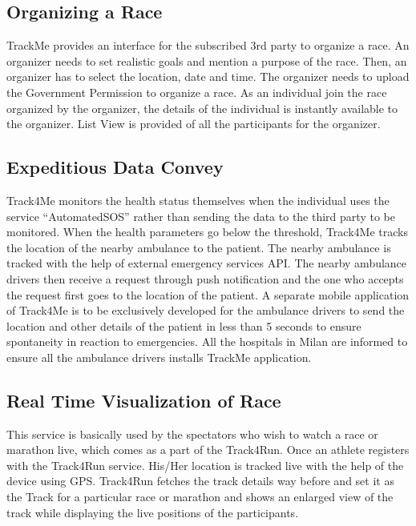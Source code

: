 \subsection{Organizing a Race}
\qquad TrackMe provides an interface for the subscribed 3rd party to organize a race.  An organizer needs to set realistic goals and mention a purpose of the race.  Then, an organizer has to select the location, date and time. The organizer needs to upload the Government Permission to organize a race. As an individual join the race organized by the organizer, the details of the individual is instantly available to the organizer. List View is provided of all the participants for the organizer.

\subsection{Expeditious Data Convey}
\qquad Track4Me monitors the health status themselves when the individual uses the service “AutomatedSOS” rather than sending the data to the third party to be monitored. When the health parameters go below the threshold, Track4Me tracks the location of the nearby ambulance to the patient. The nearby ambulance is tracked with the help of external emergency services API. The nearby ambulance drivers then receive a request through push notification and the one who accepts the request first goes to the location of the patient. A separate mobile application of Track4Me is to be exclusively developed for the ambulance drivers to send the location and other details of the patient in less than 5 seconds to ensure spontaneity in reaction to emergencies. All the hospitals in Milan are informed to ensure all the ambulance drivers installs TrackMe application.

\subsection{Real Time Visualization of Race}
\qquad This service is basically used by the spectators who wish to watch a race or marathon live, which comes as a part of the Track4Run. Once an athlete registers with the Track4Run service. His/Her location is tracked live with the help of the device using GPS. Track4Run fetches the track details way before and set it as the Track for a particular race or marathon and shows an enlarged view of the track while displaying the live positions of the participants.